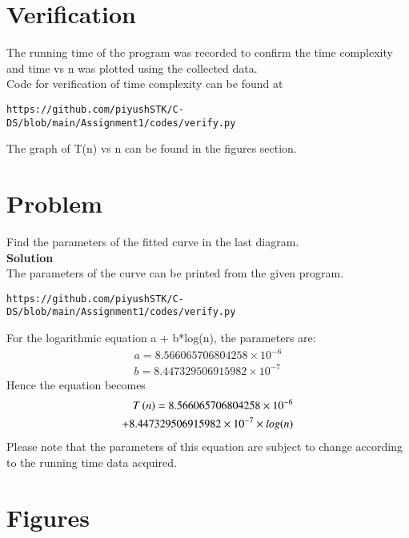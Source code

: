 \documentclass[journal,12pt,twocolumn]{IEEEtran}
\begin{document}
\section{Verification}
The running time of the program was recorded to confirm the time complexity and time vs n was plotted using the collected data.\\
Code for verification of time complexity can be found at 
\begin{lstlisting}
https://github.com/piyushSTK/C-DS/blob/main/Assignment1/codes/verify.py
\end{lstlisting}
The graph of T(n) vs n can be found in the figures section.\\

\section{Problem}
Find the parameters of the fitted curve in the last diagram.\\
\textbf{Solution}\\
The parameters of the curve can be printed from the given program.\\
\begin{lstlisting}
https://github.com/piyushSTK/C-DS/blob/main/Assignment1/codes/verify.py
\end{lstlisting}
For the logarithmic equation a + b*log(n), the parameters are: 
\begin{equation} \label{eq2}
\begin{split}
a = 8.566065706804258 \times 10^{-6}\\
b = 8.447329506915982\times 10^{-7}
\end{split}
\end{equation}
Hence the equation becomes 
\begin{equation} \label{eq2}
\begin{split}
T\left(n\right) = 8.566065706804258 \times 10^{-6} \\+ 8.447329506915982\times 10^{-7}\times log(n)
\end{split}
\end{equation}
Please note that the parameters of this equation are subject to change according to the running time data acquired.








\setcounter{figure}{0}

\section{Figures}
\label{Figures}
\end{document}
